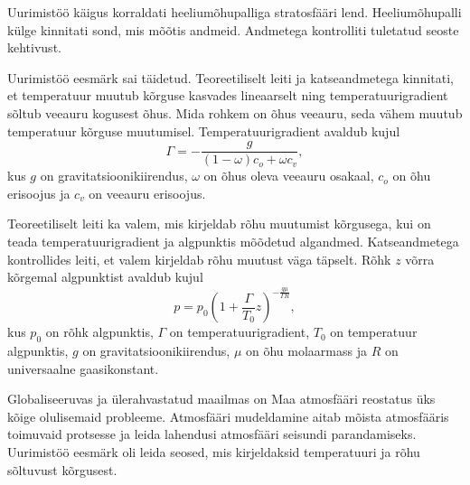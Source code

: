 \documentclass{trkut}%
\begin{document}
Uurimistöö käigus korraldati heeliumõhupalliga stratosfääri lend. Heeliumõhupalli külge kinnitati sond, mis mõõtis andmeid. Andmetega kontrolliti tuletatud seoste kehtivust.

Uurimistöö eesmärk sai täidetud. Teoreetiliselt leiti ja katseandmetega kinnitati, et temperatuur muutub kõrguse kasvades lineaarselt ning temperatuurigradient sõltub veeauru kogusest õhus. Mida rohkem on õhus veeauru, seda vähem muutub temperatuur kõrguse muutumisel. Temperatuurigradient avaldub kujul
\begin{equation*}
	\Gamma = -\frac{g}{(1-\omega)c_{o} + \omega c_{v}} ,
\end{equation*}
kus $g$ on gravitatsioonikiirendus, $\omega$ on õhus oleva veeauru osakaal, $c_o$ on õhu erisoojus ja $c_v$ on veeauru erisoojus.

Teoreetiliselt leiti ka valem, mis kirjeldab rõhu muutumist kõrgusega, kui on teada temperatuurigradient ja algpunktis mõõdetud algandmed. Katseandmetega kontrollides leiti, et valem kirjeldab rõhu muutust väga täpselt. Rõhk $z$ võrra kõrgemal algpunktist avaldub kujul 
\begin{equation*}
	p=p_0 \left(1+\frac{\Gamma}{T_0}z\right)^{ -\frac{g\mu}{\Gamma R}} ,
\end{equation*}
kus $p_0$ on rõhk algpunktis, $\Gamma$ on temperatuurigradient, $T_0$ on temperatuur algpunktis, $g$ on gravitatsioonikiirendus, $\mu$ on õhu molaarmass ja $R$ on universaalne gaasikonstant.




\printbibliography

\scriptsize

\normalsize

\scriptsize

\normalsize

\scriptsize

\normalsize

\scriptsize
%
\normalsize

%


\kinnitusleht%


Globaliseeruvas ja ülerahvastatud maailmas on Maa atmosfääri reostatus üks kõige olulisemaid probleeme. Atmosfääri mudeldamine aitab mõista atmosfääris toimuvaid protsesse ja leida lahendusi atmosfääri seisundi parandamiseks. Uurimistöö eesmärk oli leida seosed, mis kirjeldaksid temperatuuri ja rõhu sõltuvust kõrgusest.
\end{document}
